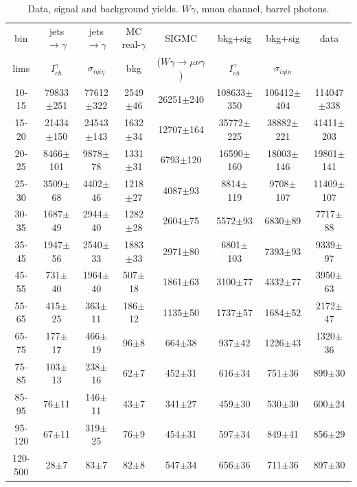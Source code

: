 \begin{table}[h]
  \tiny
  \begin{center}
  \caption{Data, signal and background yields. $W\gamma$, muon channel, barrel photons.}
  \begin{tabular}{|c|c|c|c|c|c|c|c|}
    bin & jets$\rightarrow\gamma$ & jets$\rightarrow\gamma$ & MC real-$\gamma$ & SIGMC & bkg+sig &  bkg+sig & data \\ 
    lims & $I_{ch}^{\gamma}$ & $\sigma_{i\eta i\eta}$ & bkg & ($W\gamma\rightarrow\mu\nu\gamma$) & $I_{ch}^{\gamma}$ &  $\sigma_{i\eta i\eta}$ &\\ \hline
 10-15 & 79833$\pm$251 & 77612$\pm$322 & 2549$\pm$46 & 26251$\pm$240 & 108633$\pm$350 & 106412$\pm$404 & 114047$\pm$338 \\ \hline 
15-20 & 21434$\pm$150 & 24543$\pm$143 & 1632$\pm$34 & 12707$\pm$164 & 35772$\pm$225 & 38882$\pm$221 & 41411$\pm$203 \\ \hline 
20-25 & 8466$\pm$101 & 9878$\pm$78 & 1331$\pm$31 & 6793$\pm$120 & 16590$\pm$160 & 18003$\pm$146 & 19801$\pm$141 \\ \hline 
25-30 & 3509$\pm$68 & 4402$\pm$46 & 1218$\pm$27 & 4087$\pm$93 & 8814$\pm$119 & 9708$\pm$107 & 11409$\pm$107 \\ \hline 
30-35 & 1687$\pm$49 & 2944$\pm$40 & 1282$\pm$28 & 2604$\pm$75 & 5572$\pm$93 & 6830$\pm$89 & 7717$\pm$88 \\ \hline 
35-45 & 1947$\pm$56 & 2540$\pm$33 & 1883$\pm$33 & 2971$\pm$80 & 6801$\pm$103 & 7393$\pm$93 & 9339$\pm$97 \\ \hline 
45-55 & 731$\pm$40 & 1964$\pm$40 & 507$\pm$18 & 1861$\pm$63 & 3100$\pm$77 & 4332$\pm$77 & 3950$\pm$63 \\ \hline 
55-65 & 415$\pm$25 & 363$\pm$11 & 186$\pm$12 & 1135$\pm$50 & 1737$\pm$57 & 1684$\pm$52 & 2172$\pm$47 \\ \hline 
65-75 & 177$\pm$17 & 466$\pm$19 & 96$\pm$8 & 664$\pm$38 & 937$\pm$42 & 1226$\pm$43 & 1320$\pm$36 \\ \hline 
75-85 & 103$\pm$13 & 238$\pm$16 & 62$\pm$7 & 452$\pm$31 & 616$\pm$34 & 751$\pm$36 & 899$\pm$30 \\ \hline 
85-95 & 76$\pm$11 & 146$\pm$11 & 43$\pm$7 & 341$\pm$27 & 459$\pm$30 & 530$\pm$30 & 600$\pm$24 \\ \hline 
95-120 & 67$\pm$11 & 319$\pm$25 & 76$\pm$9 & 454$\pm$31 & 597$\pm$34 & 849$\pm$41 & 856$\pm$29 \\ \hline 
120-500 & 28$\pm$7 & 83$\pm$7 & 82$\pm$8 & 547$\pm$34 & 656$\pm$36 & 711$\pm$36 & 897$\pm$30 \\ \hline 
  \end{tabular}
  \label{tab:yields_Wg_to_munu__Barrel_}
  \end{center}
\end{table}

